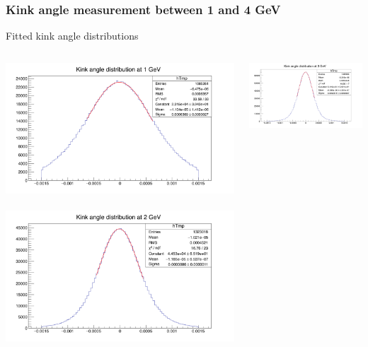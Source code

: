 \documentclass{beamer}
\begin{document}
    \begin{frame}
      \frametitle{Kink angle measurement between 1 and 4 GeV}

      \begin{block}{Fitted kink angle distributions}
        \begin{columns}[c]
          \begin{column}{5cm}
            \centering
            \includegraphics[width = \textwidth]{Pictures/kinkAngle1GeV.png}
            \
            \includegraphics[width = \textwidth]{Pictures/kinkAngle2GeV.png} 
          \end{column} 
          \begin{column}{5cm}
            \centering
            \includegraphics[width = \textwidth]{Pictures/kinkAngle3GeV.png}

\end{column}
\end{columns}
\end{block}
\end{frame}
\end{document}
